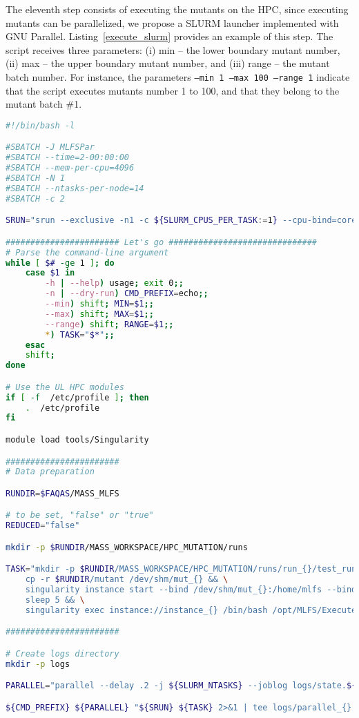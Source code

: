 The eleventh step consists of executing the mutants on the HPC, since executing mutants can be parallelized, we propose a SLURM launcher implemented with GNU Parallel. Listing~\ref{execute_slurm} provides an example of this step. 
The script receives three parameters: (i) min -- the lower boundary mutant number, (ii) max -- the upper boundary mutant number, and (iii) range -- the mutant batch number. For instance, the parameters \texttt{--min 1 --max 100 --range 1} indicate that the script executes mutants number 1 to 100, and that they belong to the mutant batch \#1.

\begin{lstlisting}[language=bash, label=execute_slurm ,caption=Example of the SLURM launcher for the execution of mutants on the HPC.]
#!/bin/bash -l

#SBATCH -J MLFSPar
#SBATCH --time=2-00:00:00
#SBATCH --mem-per-cpu=4096
#SBATCH -N 1
#SBATCH --ntasks-per-node=14
#SBATCH -c 2

SRUN="srun --exclusive -n1 -c ${SLURM_CPUS_PER_TASK:=1} --cpu-bind=cores"

####################### Let's go ##############################
# Parse the command-line argument
while [ $# -ge 1 ]; do
    case $1 in
        -h | --help) usage; exit 0;;
        -n | --dry-run) CMD_PREFIX=echo;;
        --min) shift; MIN=$1;;
        --max) shift; MAX=$1;;
        --range) shift; RANGE=$1;;
        *) TASK="$*";;
    esac
    shift;
done

# Use the UL HPC modules
if [ -f  /etc/profile ]; then
    .  /etc/profile
fi

module load tools/Singularity

#######################
# Data preparation

RUNDIR=$FAQAS/MASS_MLFS

# to be set, "false" or "true"
REDUCED="false"

mkdir -p $RUNDIR/MASS_WORKSPACE/HPC_MUTATION/runs

TASK="mkdir -p $RUNDIR/MASS_WORKSPACE/HPC_MUTATION/runs/run_{}/test_runs && \
    cp -r $RUNDIR/mutant /dev/shm/mut_{} && \
    singularity instance start --bind /dev/shm/mut_{}:/home/mlfs --bind $RUNDIR/MASS_WORKSPACE/HPC_MUTATION/runs/run_{}/test_runs:/home/mlfs/test_runs --bind $FAQAS/srcirorfaqas:/opt/srcirorfaqas --bind $RUNDIR/MASS_WORKSPACE:/opt/MLFS --bind $FAQAS/MASS_MLFS/unit-test-suite:/home/mlfs/unit-test-suite --bind $FAQAS/MASS_MLFS/unit-reports:/home/mlfs/unit-reports $FAQAS/MASS_MLFS/blts.sif instance_{} && \
    sleep 5 && \
    singularity exec instance://instance_{} /bin/bash /opt/MLFS/ExecuteMutants_HPC.sh {} $REDUCED"

#######################

# Create logs directory
mkdir -p logs

PARALLEL="parallel --delay .2 -j ${SLURM_NTASKS} --joblog logs/state.${RANGE}.parallel.log --resume"

${CMD_PREFIX} ${PARALLEL} "${SRUN} ${TASK} 2>&1 | tee logs/parallel_{}.log && ${SRUN} singularity instance stop instance_{} && rm -rf /dev/shm/mut_{}" ::: $(seq ${MIN} ${MAX})
\end{lstlisting}

